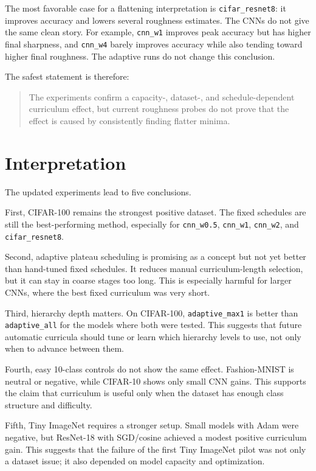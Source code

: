 The most favorable case for a flattening interpretation is
\texttt{cifar\_resnet8}: it improves accuracy and lowers several roughness
estimates. The CNNs do not give the same clean story. For example,
\texttt{cnn\_w1} improves peak accuracy but has higher final sharpness, and
\texttt{cnn\_w4} barely improves accuracy while also tending toward higher final
roughness. The adaptive runs do not change this conclusion.

The safest statement is therefore:

\begin{quote}
The experiments confirm a capacity-, dataset-, and schedule-dependent curriculum
effect, but current roughness probes do not prove that the effect is caused by
consistently finding flatter minima.
\end{quote}

\section{Interpretation}

The updated experiments lead to five conclusions.

First, CIFAR-100 remains the strongest positive dataset. The fixed schedules are
still the best-performing method, especially for \texttt{cnn\_w0.5},
\texttt{cnn\_w1}, \texttt{cnn\_w2}, and \texttt{cifar\_resnet8}.

Second, adaptive plateau scheduling is promising as a concept but not yet better
than hand-tuned fixed schedules. It reduces manual curriculum-length selection,
but it can stay in coarse stages too long. This is especially harmful for larger
CNNs, where the best fixed curriculum was very short.

Third, hierarchy depth matters. On CIFAR-100, \texttt{adaptive\_max1} is better
than \texttt{adaptive\_all} for the models where both were tested. This suggests
that future automatic curricula should tune or learn which hierarchy levels to
use, not only when to advance between them.

Fourth, easy 10-class controls do not show the same effect. Fashion-MNIST is
neutral or negative, while CIFAR-10 shows only small CNN gains. This supports the
claim that curriculum is useful only when the dataset has enough class structure
and difficulty.

Fifth, Tiny ImageNet requires a stronger setup. Small models with Adam were
negative, but ResNet-18 with SGD/cosine achieved a modest positive curriculum
gain. This suggests that the failure of the first Tiny ImageNet pilot was not
only a dataset issue; it also depended on model capacity and optimization.

